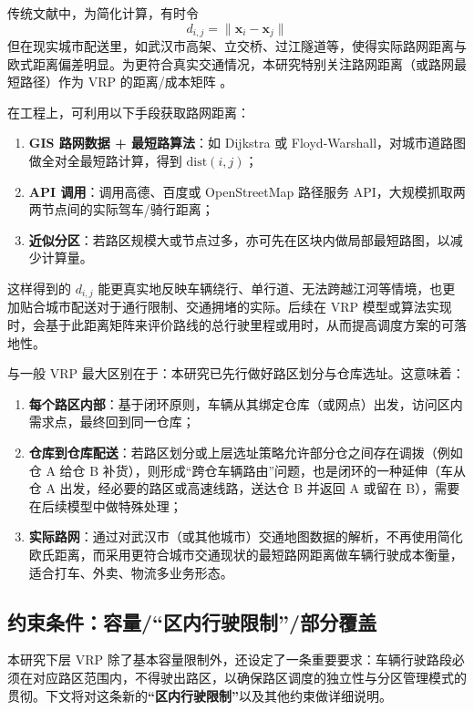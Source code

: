 \documentclass[12pt,a4paper,twoside]{ctexbook}
\begin{document}
传统文献中，为简化计算，有时令
\[
d_{i,j} = \|\mathbf{x}_i - \mathbf{x}_j\|
\]
但在现实城市配送里，如武汉市高架、立交桥、过江隧道等，使得实际路网距离与欧式距离偏差明显。为更符合真实交通情况，本研究特别关注路网距离（或路网最短路径）作为 VRP 的距离/成本矩阵 \cite{laporte2009fifty}。

在工程上，可利用以下手段获取路网距离：
\begin{enumerate}
    \item \textbf{GIS 路网数据 + 最短路算法}：如 Dijkstra 或 Floyd-Warshall，对城市道路图做全对全最短路计算，得到 $\mathrm{dist}(i,j)$；
    \item \textbf{API 调用}：调用高德、百度或 OpenStreetMap 路径服务 API，大规模抓取两两节点间的实际驾车/骑行距离；
    \item \textbf{近似分区}：若路区规模大或节点过多，亦可先在区块内做局部最短路图，以减少计算量。
\end{enumerate}

这样得到的 $d_{i,j}$ 能更真实地反映车辆绕行、单行道、无法跨越江河等情境，也更加贴合城市配送对于通行限制、交通拥堵的实际。后续在 VRP 模型或算法实现时，会基于此距离矩阵来评价路线的总行驶里程或用时，从而提高调度方案的可落地性。


与一般 VRP 最大区别在于：本研究已先行做好路区划分与仓库选址。这意味着：
\begin{enumerate}
    \item \textbf{每个路区内部}：基于闭环原则，车辆从其绑定仓库（或网点）出发，访问区内需求点，最终回到同一仓库；
    \item \textbf{仓库到仓库配送}：若路区划分或上层选址策略允许部分仓之间存在调拨（例如仓 A 给仓 B 补货），则形成“跨仓车辆路由”问题，也是闭环的一种延伸（车从仓 A 出发，经必要的路区或高速线路，送达仓 B 并返回 A 或留在 B），需要在后续模型中做特殊处理；
    \item \textbf{实际路网}：通过对武汉市（或其他城市）交通地图数据的解析，不再使用简化欧氏距离，而采用更符合城市交通现状的最短路网距离做车辆行驶成本衡量，适合打车、外卖、物流多业务形态。
\end{enumerate}

\subsection{约束条件：容量/“区内行驶限制”/部分覆盖}

本研究下层 VRP 除了基本容量限制外，还设定了一条重要要求：车辆行驶路段必须在对应路区范围内，不得驶出路区，以确保路区调度的独立性与分区管理模式的贯彻。下文将对这条新的\textbf{“区内行驶限制”}以及其他约束做详细说明。
\end{document}

